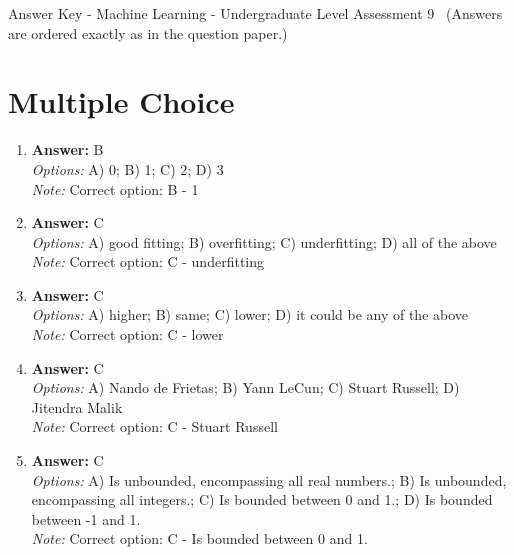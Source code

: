 \documentclass[12pt]{article}
\begin{document}
\begin{center}
Answer Key - Machine Learning - Undergraduate Level Assessment 9 \
\small (Answers are ordered exactly as in the question paper.)
\end{center}

\section*{Multiple Choice}
\begin{enumerate}[label=\arabic*.]
\item \textbf{Answer:} B
\\ \textit{Options:} A) 0; B) 1; C) 2; D) 3
\\ \textit{Note:} Correct option: B - 1
\item \textbf{Answer:} C
\\ \textit{Options:} A) good fitting; B) overfitting; C) underfitting; D) all of the above
\\ \textit{Note:} Correct option: C - underfitting
\item \textbf{Answer:} C
\\ \textit{Options:} A) higher; B) same; C) lower; D) it could be any of the above
\\ \textit{Note:} Correct option: C - lower
\item \textbf{Answer:} C
\\ \textit{Options:} A) Nando de Frietas; B) Yann LeCun; C) Stuart Russell; D) Jitendra Malik
\\ \textit{Note:} Correct option: C - Stuart Russell
\item \textbf{Answer:} C
\\ \textit{Options:} A) Is unbounded, encompassing all real numbers.; B) Is unbounded, encompassing all integers.; C) Is bounded between 0 and 1.; D) Is bounded between -1 and 1.
\\ \textit{Note:} Correct option: C - Is bounded between 0 and 1.
\end{enumerate}
\end{document}

